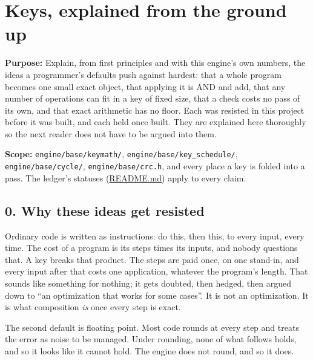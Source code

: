 \chapter{\texorpdfstring{Keys, explained from the ground up}{Keys, explained from the ground up}}
\label{chap:keys-explained}

\textbf{Purpose:} Explain, from first principles and with this engine's own numbers, the ideas a programmer's defaults push against hardest: that a whole program becomes one small exact object, that applying it is AND and add, that any number of operations can fit in a key of fixed size, that a check costs no pass of its own, and that exact arithmetic has no floor. Each was resisted in this project before it was built, and each held once built. They are explained here thoroughly so the next reader does not have to be argued into them.

\textbf{Scope:} \texttt{engine/\allowbreak{}base/\allowbreak{}keymath/\allowbreak{}}, \texttt{engine/\allowbreak{}base/\allowbreak{}key\_\allowbreak{}schedule/\allowbreak{}}, \texttt{engine/\allowbreak{}base/\allowbreak{}cycle/\allowbreak{}}, \texttt{engine/\allowbreak{}base/\allowbreak{}crc.\allowbreak{}h}, and every place a key is folded into a pass. The ledger's statuses (\hyperref[chap:readme]{README.md}) apply to every claim.

\section{\texorpdfstring{0. Why these ideas get resisted}{0. Why these ideas get resisted}}

Ordinary code is written as instructions: do this, then this, to every input, every time. The cost of a program is its steps times its inputs, and nobody questions that. A key breaks that product. The steps are paid once, on one stand-in, and every input after that costs one application, whatever the program's length. That sounds like something for nothing; it gets doubted, then hedged, then argued down to “an optimization that works for some cases”. It is not an optimization. It is what composition \emph{is} once every step is exact.

The second default is floating point. Most code rounds at every step and treats the error as noise to be managed. Under rounding, none of what follows holds, and so it looks like it cannot hold. The engine does not round, and so it does.

